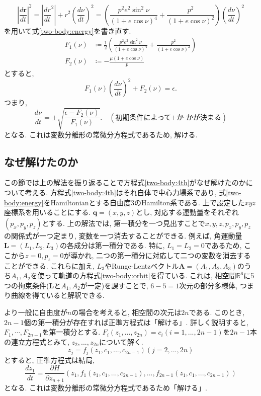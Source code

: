 \documentclass{ltjsarticle}
\theoremstyle{definition}
\numberwithin{thm}{section}
\theoremstyle{definition}
\numberwithin{prop}{section}
\theoremstyle{definition}
\numberwithin{dfn}{section}
\numberwithin{equation}{section}
\begin{document}
\begin{equation*}
    |\frac{d\bm{r}}{dt}|^2=|\frac{dr}{dt}^2|+r^2\left(\frac{d\nu}{dt}\right)^2=\left(\frac{p^2e^2\sin^2{\nu}}{(1+e\cos{\nu})^4}+\frac{p^2}{(1+e\cos{\nu})^2}\right)\left(\frac{d\nu}{dt}\right)^2
\end{equation*}
を用いて式\ref{two-body:energy}を書き直す. 
\begin{equation}
    \begin{aligned}
        F_1(\nu)&\coloneq \frac{1}{2}(\frac{p^2e^2\sin^2{\nu}}{(1+e\cos{\nu})^4}+\frac{p^2}{(1+e\cos{\nu})^2})\\
        F_2(\nu)&\coloneq -\frac{\mu (1+e\cos{\nu})}{p}
    \end{aligned}
\end{equation}
とすると,
\begin{equation*}
    F_1(\nu)\left(\frac{d\nu}{dt}\right)^2+F_2(\nu)=\epsilon.
\end{equation*}
つまり,
\begin{equation}
    \frac{d\nu}{dt}=\pm \sqrt{\frac{\epsilon-F_2(\nu)}{F_1(\nu)}}.\quad (\text{初期条件によって+か-かが決まる})
\end{equation}
となる. これは変数分離形の常微分方程式であるため, 解ける.
\subsection{なぜ解けたのか}
この節では上の解法を振り返ることで方程式\ref{two-body:4th}がなぜ解けたのかについて考える. 方程式\ref{two-body:4th}はそれ自体で中心力場系であり, 式\ref{two-body:energy}をHamiltonianとする自由度3のHamilton系である. 上で設定した$xyz$座標系を用いることにする. $\bm{q}=(x,y,z)$とし, 対応する運動量をそれぞれ$(p_x,p_y,p_z)$とする. 上の解法では, 第一積分を一つ見出すことで$x,y,z,p_x,p_y,p_z$の関係式が一つ定まり, 変数を一つ消去することができる. 例えば, 角運動量$\bm{L}=(L_1,L_2,L_3)$の各成分は第一積分である. 特に, $L_1=L_2=0$であるため, ここから$z=0,p_z=0$が導かれ, 二つの第一積分に対応して二つの変数を消去することができる. これらに加え, $L_3$やRunge-Lentzベクトル$\bm{A}=(A_1,A_2,A_3)$のうち$A_1,A_2$を使って軌道の方程式\ref{two-body:orbit}を得ている. これは, 相空間$\mathbb{R}^6$に5つの拘束条件($\bm{L}$と$A_1,A_2$が一定)を課すことで, $6-5=1$次元の部分多様体, つまり曲線を得ていると解釈できる.

より一般に自由度が$n$の場合を考えると, 相空間の次元は$2n$である. このとき,$2n-1$個の第一積分が存在すれば正準方程式は「解ける」. 詳しく説明すると, $F_1,\cdots,F_{2n-1}$を第一積分とする. $F_i(z_1,...,z_{2n})=c_i(i=1,...,2n-1)$を$2n-1$本の連立方程式とみて, $z_2,...,z_{2n}$について解く.
\begin{equation*}
    z_j=f_j(z_1,c_1,...,c_{2n-1})(j=2,...,2n)
\end{equation*}
とすると, 正準方程式は結局,
\begin{equation}
    \frac{dz_1}{dt}=\frac{\partial H}{\partial z_{n+1}}(z_1,f_1(z_1,c_1,...,c_{2n-1}),...,f_{2n-1}(z_1,c_1,...,c_{2n-1}))
\end{equation}
となる. これは変数分離形の常微分方程式であるため「解ける」.
 
\end{document}
